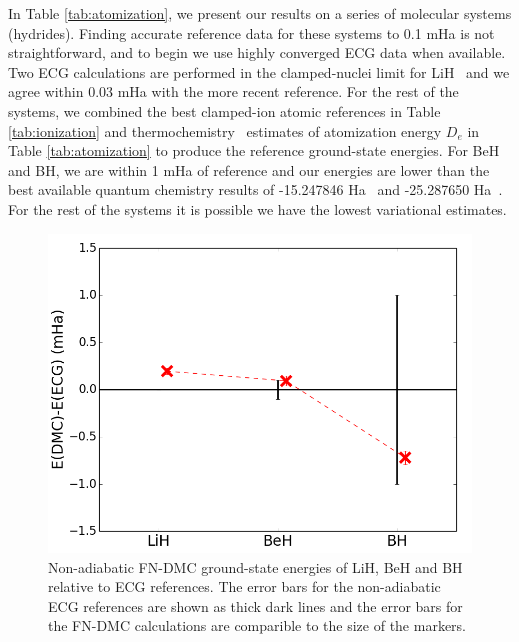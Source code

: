 \documentclass[pra,superscriptaddress,groupedaddress,twocolumn]{revtex4}
\begin{document}

In Table \ref{tab:atomization}, we present our results on a series of molecular systems (hydrides). Finding accurate reference data for these systems to 0.1 mHa is not straightforward, and to begin we use highly converged ECG data when available. Two ECG calculations are performed in the clamped-nuclei limit for LiH~\cite{Cencek_LiH,Adamowicz_LiH} and we agree within 0.03 mHa with the more recent reference. For the rest of the systems, we combined the best clamped-ion atomic references in Table \ref{tab:ionization} and thermochemistry~\cite{Feller_Corrections} estimates of atomization energy $D_e$ in Table \ref{tab:atomization} to produce the reference ground-state energies. For BeH and BH, we are within 1 mHa of reference and our energies are lower than the best available quantum chemistry results of -15.247846 Ha~\cite{Koput_BeH} and -25.287650 Ha~\cite{Miliordos_BH}. For the rest of the systems it is possible we have the lowest variational estimates. %

\begin{figure}[h]
\centering
\includegraphics[scale=.37]{Figures/dia-ECG}
\caption{Non-adiabatic FN-DMC ground-state energies of LiH, BeH and BH relative to ECG references. The error bars for the non-adiabatic ECG references are shown as thick dark lines and the error bars for the FN-DMC calculations are comparible to the size of the markers. \label{fig:dia-ECG}}
\end{figure}
\end{document}
